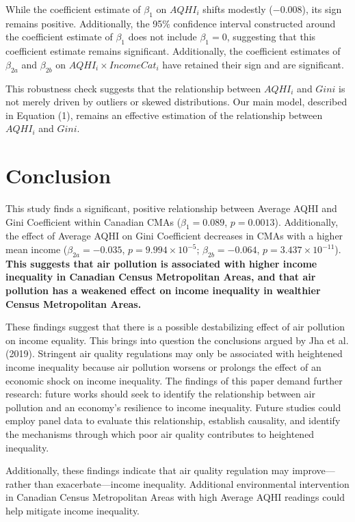 \documentclass[AEJ]{AEA}
\begin{document}
While the coefficient estimate of $\beta_1$ on $AQHI_i$ shifts modestly ($-$0.008), its 
sign remains positive. Additionally, the 95\% confidence interval constructed around
the coefficient estimate of $\beta_1$ does not include $\beta_1 = 0$, suggesting 
that this coefficient estimate remains significant. Additionally, the coefficient estimates
of $\beta_{2a}$ and $\beta_{2b}$ on $AQHI_i \times IncomeCat_i$ have retained their
sign and are significant.

This robustness check suggests that the relationship between 
$AQHI_i$ and $Gini$ is not merely driven by outliers or skewed distributions.
Our main model, described in Equation (1), remains an effective estimation of the
relationship between $AQHI_i$ and $Gini$.

\section{Conclusion}

This study finds a significant, positive relationship between Average 
AQHI and Gini Coefficient within Canadian CMAs ($\beta_1 = 0.089$, $p = 0.0013$). 
Additionally, the effect of Average AQHI 
on Gini Coefficient decreases in CMAs with a higher mean income ($\beta_{2a} = -0.035$,
$p = 9.994 \times 10^{-5}$; $\beta_{2b} = -0.064$, $p = 3.437\times10^{-11}$). 
\textbf{This suggests that air pollution is associated with higher income inequality in Canadian
Census Metropolitan Areas, and that air pollution has a weakened effect on income inequality 
in wealthier Census Metropolitan Areas.} 

These findings suggest that there is a possible destabilizing effect of air pollution 
on income equality. This brings into question the conclusions argued by Jha et al. (2019).
Stringent air quality regulations may only be associated with heightened income inequality
because air pollution worsens or prolongs the effect of an economic shock on income inequality.
The findings of this paper demand further research: future works should seek to identify
the relationship between air pollution and an economy’s resilience to income inequality.
Future studies could employ panel data to evaluate this relationship, establish causality, and identify 
the mechanisms through which poor air quality contributes to heightened inequality.

Additionally, these findings indicate that air quality regulation may improve—rather
than exacerbate—income inequality. Additional environmental intervention in Canadian 
Census Metropolitan Areas with high Average AQHI readings could help mitigate income inequality. 
\end{document}
